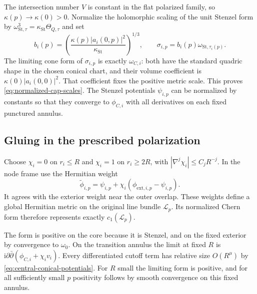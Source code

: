 The intersection number $V$ is constant in the flat polarized
family, so $\kappa(p)\to\kappa(0)>0$. Normalize the holomorphic
scaling of the unit Stenzel form by
$\omega_{\mathrm{St},\tau}^3=\kappa_{\mathrm{St}}\Theta_{Q,\tau}$
and set
\begin{equation}\label{eq:stenzel-volume-normalization}
 b_i(p)=
 \left(\frac{\kappa(p)|a_i(0,p)|^2}
                  {\kappa_{\mathrm{St}}}\right)^{1/3},
 \qquad
 \sigma_{i,p}=b_i(p)\omega_{\mathrm{St},\tau_i(p)}.
\end{equation}
The limiting cone form of $\sigma_{i,p}$ is exactly
$\omega_{C,i}$: both have the standard quadric shape in
the chosen conical chart, and their volume coefficient is
$\kappa(0)|a_i(0,0)|^2$. That coefficient fixes the positive
metric scale. This proves \eqref{eq:normalized-cap-scales}.
The Stenzel potentials $\psi_{i,p}$ can be normalized by
constants so that they converge to $\phi_{C,i}$ with all
derivatives on each fixed punctured annulus.

\subsection{Gluing in the prescribed polarization}

Choose $\chi_i=0$ on $r_i\le R$ and $\chi_i=1$ on
$r_i\ge2R$, with $|\nabla^j\chi_i|\le C_jR^{-j}$.
In the node frame use the Hermitian weight
\begin{equation}\label{eq:initial-weight-gluing}
 \widetilde\phi_{i,p}
   =\psi_{i,p}+\chi_i
                  (\phi_{\mathrm{ext},i,p}-\psi_{i,p}).
\end{equation}
It agrees with the exterior weight near the outer overlap.
These weights define a global Hermitian metric on the
original line bundle $\mathcal L_p$. Its normalized Chern
form therefore represents exactly $c_1(\mathcal L_p)$.

The form is positive on the core because it is Stenzel,
and on the fixed exterior by convergence to $\omega_0$.
On the transition annulus the limit at fixed $R$ is
$\mathrm i\partial\bar\partial(\phi_{C,i}+\chi_iv_i)$.
Every differentiated cutoff term has relative size
$O(R^\mu)$ by \eqref{eq:central-conical-potentials}.
For $R$ small the limiting form is positive, and for
all sufficiently small $p$ positivity follows by smooth
convergence on this fixed annulus.

